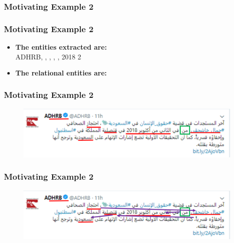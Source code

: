 \documentclass[xcolor=table]{beamer}
\begin{document}
\begin{frame}
\frametitle{Motivating Example 2}
\end{frame}
\begin{frame}
\frametitle{Motivating Example 2}
\begin{itemize}
\item \textbf{The entities extracted are:}
\\ ADHRB, ,
,
,
,
2018 2 
\\
\item \textbf{The relational entities are:}\\

\end{itemize}
\end{frame}

\begin{frame}
\frametitle{Motivating Example 2}
\begin{figure}[!htb]
   \centering
    \includegraphics[scale=0.55]{img0009_1.png}
    
\end{figure}

\end{frame}

\begin{frame}
\frametitle{Motivating Example 2}
\begin{figure}[!htb]
   \centering
    \includegraphics[scale=0.55]{img0009_2.png}
    
\end{figure}
\end{frame}
\end{document}
